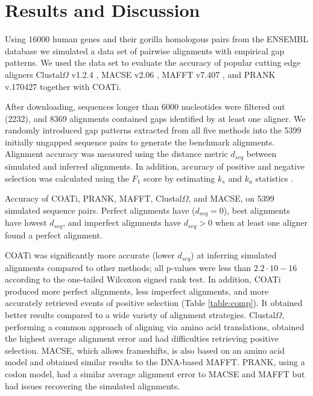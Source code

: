 \section*{Results and Discussion}
Using 16000 human genes and their gorilla homologous pairs from the ENSEMBL
database \parencite{ensembl_hubbard_2002} we simulated a data set of pairwise
alignments with empirical gap patterns.
We used the data set to evaluate the accuracy of popular cutting edge aligners
Clustal$\Omega$ v1.2.4 \parencite{clustal_omega_sievers_2011},
MACSE v2.06 \parencite{ranwez_macse_2011}, MAFFT v7.407
\parencite{mafft_katoh_2002}, and PRANK v.170427 \parencite{prank_loytynoja_2014}
together with COATi.

After downloading, sequences longer than 6000 nucleotides were filtered out
(2232), and 8369 alignments contained gaps identified by at least one
aligner.
We randomly introduced gap patterns extracted from all five methods into the
5399 initially ungapped sequence pairs to generate the benchmark alignments.
Alignment accuracy was measured using the distance metric $d_{seq}$
\parencite{metrics_blackburne_whelan_2011} between simulated and inferred
alignments.
In addition, accuracy of positive and negative selection was calculated
using the $F_1$ score by estimating $k_s$ and $k_a$ statistics
\parencite{ka_ks_li_1993}.

\begin{table}[!ht]
\centering
 \frame{}
 \caption{Accuracy of COATi, PRANK, MAFFT, Clustal$\Omega$, and MACSE, on 5399
         simulated sequence pairs. Perfect alignments have ($d_{seq}=0$), best
         alignments have lowest $d_{seq}$, and imperfect alignments have
         $d_{seq}>0$ when at least one aligner found a perfect alignment.}
 \label{table:comp}
\end{table}

COATi was significantly more accurate (lower $d_{seq}$) at inferring simulated alignments compared to other methods; all p-values were less than $2.2\cdot10-16$ according to the one-tailed Wilcoxon signed rank test.
In addition, COATi produced more perfect alignments, less imperfect alignments, and more accurately retrieved events of positive selection (Table \ref{table:comp}).
It obtained better results compared to a wide variety of alignment strategies.
Clustal$\Omega$, performing a common approach of aligning via amino acid translations, obtained the highest average alignment error and had difficulties retrieving positive selection.
MACSE, which allows frameshifts, is also based on an amino acid model and obtained similar results to the DNA-based MAFFT.
PRANK, using a codon model, had a similar average alignment error to MACSE and MAFFT but had issues recovering the simulated alignments.

